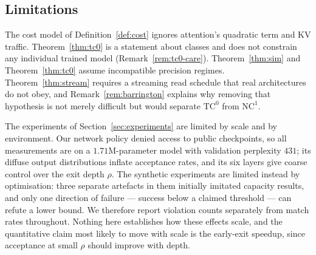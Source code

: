 \subsection{Limitations}

The cost model of Definition~\ref{def:cost} ignores attention's quadratic term
and KV traffic. Theorem~\ref{thm:tc0} is a statement about classes and does not
constrain any individual trained model (Remark~\ref{rem:tc0-care}).
Theorem~\ref{thm:sim} and Theorem~\ref{thm:tc0} assume incompatible precision
regimes. Theorem~\ref{thm:stream} requires a streaming read schedule that real
architectures do not obey, and Remark~\ref{rem:barrington} explains why removing
that hypothesis is not merely difficult but would separate $\mathrm{TC}^0$ from
$\mathrm{NC}^1$.

The experiments of Section~\ref{sec:experiments} are limited by scale and by
environment. Our network policy denied access to public checkpoints, so all
measurements are on a $1.71$M-parameter model with validation perplexity $431$;
its diffuse output distributions inflate acceptance rates, and its six layers
give coarse control over the exit depth $\rho$. The synthetic experiments are
limited instead by optimisation: three separate artefacts in them initially
imitated capacity results, and only one direction of failure --- success below a
claimed threshold --- can refute a lower bound. We therefore report violation
counts separately from match rates throughout. Nothing here establishes how
these effects scale, and the quantitative claim most likely to move with scale is
the early-exit speedup, since acceptance at small $\rho$ should improve with
depth.
